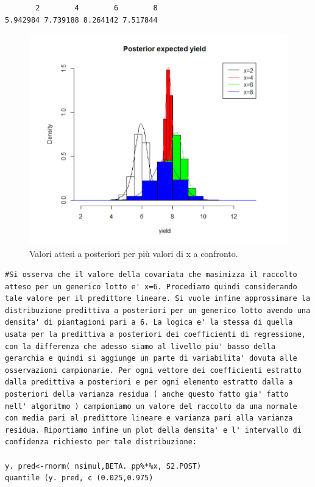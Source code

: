 {
\color{red}
\begin{Verbatim}
       2        4        6        8
5.942984 7.739188 8.264142 7.517844
\end{Verbatim}
}

\begin{figure}
    \centering
    \includegraphics[totalheight=8cm]{img/esercizio11-2-5.png}
    \caption{  Valori attesi a posteriori per più valori di x a confronto.}
\end{figure}

\begin{lstlisting}[style=R]
#Si osserva che il valore della covariata che masimizza il raccolto atteso per un generico lotto e' x=6. Procediamo quindi considerando tale valore per il predittore lineare. Si vuole infine approssimare la distribuzione predittiva a posteriori per un generico lotto avendo una densita' di piantagioni pari a 6. La logica e' la stessa di quella usata per la predittiva a posteriori dei coefficienti di regressione, con la differenza che adesso siamo al livello piu' basso della gerarchia e quindi si aggiunge un parte di variabilita' dovuta alle osservazioni campionarie. Per ogni vettore dei coefficienti estratto dalla predittiva a posteriori e per ogni elemento estratto dalla a posteriori della varianza residua ( anche questo fatto gia' fatto nell' algoritmo ) campioniamo un valore del raccolto da una normale con media pari al predittore lineare e varianza pari alla varianza residua. Riportiamo infine un plot della densita' e l' intervallo di confidenza richiesto per tale distribuzione:

y. pred<-rnorm( nsimul,BETA. pp%*%x, S2.POST)
quantile (y. pred, c (0.025,0.975) 
\end{lstlisting}


